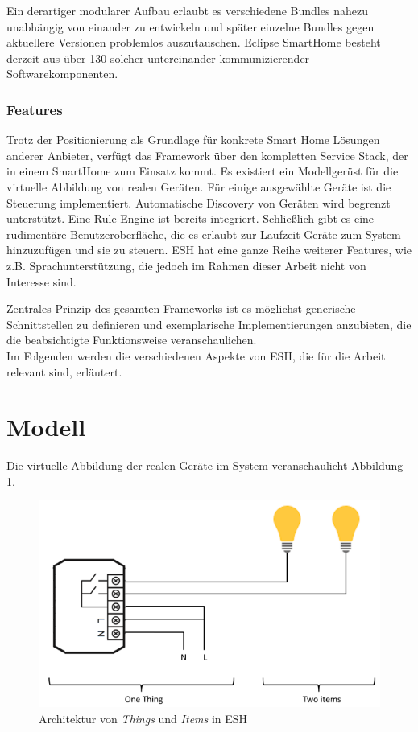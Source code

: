 Ein derartiger modularer Aufbau erlaubt es verschiedene Bundles nahezu unabhängig von einander zu entwickeln und später einzelne Bundles gegen aktuellere Versionen problemlos auszutauschen. Eclipse SmartHome besteht derzeit aus über 130 solcher untereinander kommunizierender Softwarekomponenten.


\subsubsection{Features}
Trotz der Positionierung als Grundlage für konkrete Smart Home Lösungen anderer Anbieter, verfügt das Framework über den kompletten Service Stack, der in einem SmartHome zum Einsatz kommt. Es existiert ein Modellgerüst für die virtuelle Abbildung von realen Geräten. Für einige ausgewählte Geräte ist die Steuerung implementiert. Automatische Discovery von Geräten wird begrenzt unterstützt. Eine Rule Engine ist bereits integriert. Schließlich gibt es eine rudimentäre Benutzeroberfläche, die es erlaubt zur Laufzeit Geräte zum System hinzuzufügen und sie zu steuern. ESH hat eine ganze Reihe weiterer Features, wie z.B. Sprachunterstützung, die jedoch im Rahmen dieser Arbeit nicht von Interesse sind. 

Zentrales Prinzip des gesamten Frameworks ist es möglichst generische Schnittstellen zu definieren und exemplarische Implementierungen anzubieten, die die beabsichtigte Funktionsweise veranschaulichen. \\

Im Folgenden werden die verschiedenen Aspekte von ESH, die für die Arbeit relevant sind, erläutert.

\section{Modell}
Die virtuelle Abbildung der realen Geräte im System veranschaulicht Abbildung \ref{fig:esh_model}.

\begin{figure}[h]
	\centering
	\includegraphics[width=\textwidth]{bilder/esh_model}
	\caption{Architektur von \textit{Things} und \textit{Items} in ESH \cite{ESH:home}}
	\label{fig:esh_model}
\end{figure}

